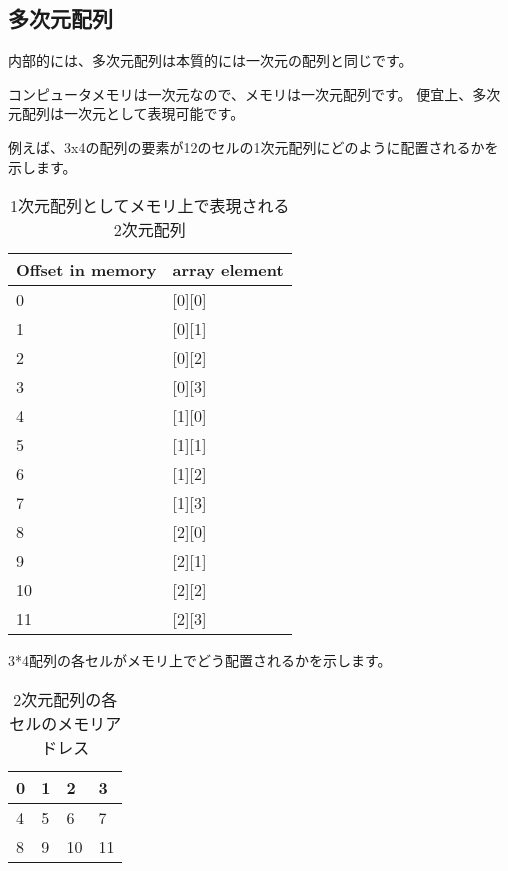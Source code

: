 ﻿\subsection{多次元配列}

内部的には、多次元配列は本質的には一次元の配列と同じです。

コンピュータメモリは一次元なので、メモリは一次元配列です。
便宜上、多次元配列は一次元として表現可能です。

例えば、3x4の配列の要素が12のセルの1次元配列にどのように配置されるかを示します。

\begin{table}[H]
\centering
\begin{tabular}{ | l | l | }
\hline
Offset in memory & array element \\
\hline
0 & [0][0] \\
\hline
1 & [0][1] \\
\hline
2 & [0][2] \\
\hline
3 & [0][3] \\
\hline
4 & [1][0] \\
\hline
5 & [1][1] \\
\hline
6 & [1][2] \\
\hline
7 & [1][3] \\
\hline
8 & [2][0] \\
\hline
9 & [2][1] \\
\hline
10 & [2][2] \\
\hline
11 & [2][3] \\
\hline
\end{tabular}
\caption{1次元配列としてメモリ上で表現される2次元配列}
\end{table}

3*4配列の各セルがメモリ上でどう配置されるかを示します。

\begin{table}[H]
\centering
\begin{tabular}{ | l | l | l | l | }
\hline                        
0 & 1 & 2 & 3 \\
\hline  
4 & 5 & 6 & 7 \\
\hline  
8 & 9 & 10 & 11 \\
\hline  
\end{tabular}
\caption{2次元配列の各セルのメモリアドレス}
\end{table}

